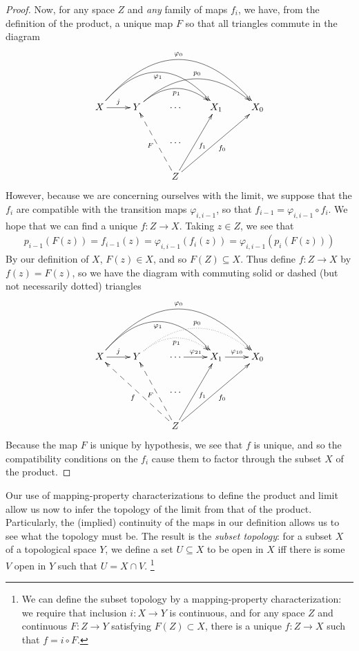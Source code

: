 \begin{claim}
\begin{proof}
          Now, for any space $Z$ and \emph{any} family of maps $f_i$, we have, from the definition of the product, a unique map $F$ so that all triangles commute in the diagram
          \begin{displaymath}
            \xymatrix{
              X \ar[r]^j \ar@/^37pt/[rrr]_{\varphi_1} \ar@/^50pt/[rrrr]^{\varphi_0}
              & Y \ar@/^20pt/[rr]_{p_1} \ar@/^30pt/[rrr]^{p_0}
              & \cdots
              & X_1
              & X_0
              \\ && \cdots \\
              && Z \ar@{-->}[uul]^F \ar[uur]_{f_1} \ar[uurr]_{f_0}
            }
          \end{displaymath}
          However, because we are concerning ourselves with the limit, we suppose that the $f_i$ are compatible with the transition maps $\varphi_{i,i-1}$, so that $f_{i-1} = \varphi_{i,i-1}\circ f_i$.
          We hope that we can find a unique $f:Z\rightarrow X$.
          Taking $z\in Z$, we see that
          \begin{align*}
            p_{i-1}(F(z)) = f_{i-1}(z) = \varphi_{i,i-1}(f_i(z)) = \varphi_{i,i-1}(p_i(F(z)))
          \end{align*}
          By our definition of $X$, $F(z)\in X$, and so $F(Z)\subseteq X$.
          Thus define $f:Z\rightarrow X$ by $f(z) = F(z)$, so we have the diagram with commuting solid or dashed (but not necessarily dotted) triangles
          \begin{displaymath}
            \xymatrix{
              X \ar[r]^j \ar@/^37pt/[rrr]_{\varphi_1} \ar@/^50pt/[rrrr]^{\varphi_0}
              & Y \ar@/^20pt/@{..>}[rr]_{p_1} \ar@/^30pt/@{..>}[rrr]^{p_0}
              & \cdots \ar[r]^{\varphi_{21}}
              & X_1 \ar[r]^{\varphi_{10}}
              & X_0
              \\ && \cdots \\
              && Z \ar@{-->}[uull]^f \ar@{-->}[uul]^F \ar[uur]_{f_1} \ar[uurr]_{f_0}
            }
          \end{displaymath}
          Because the map $F$ is unique by hypothesis, we see that $f$ is unique, and so the compatibility conditions on the $f_i$ cause them to factor through the subset $X$ of the product.
        \end{proof}
      \end{claim}

      Our use of mapping-property characterizations to define the product and limit allow us now to infer the topology of the limit from that of the product.
      Particularly, the (implied) continuity of the maps in our definition allows us to see what the topology must be.
      The result is the \emph{subset topology}: for a subset $X$ of a topological space $Y$, we define a set $U\subseteq X$ to be open in $X$ iff there is some $V$ open in $Y$ such that $U=X\cap V$.%
      \footnote{We can define the subset topology by a mapping-property characterization: we require that inclusion $i:X\rightarrow Y$ is continuous, and for any space $Z$ and continuous $F:Z\rightarrow Y$ satisfying $F(Z)\subset X$, there is a unique $f:Z\rightarrow X$ such that $f=i\circ F$.}

